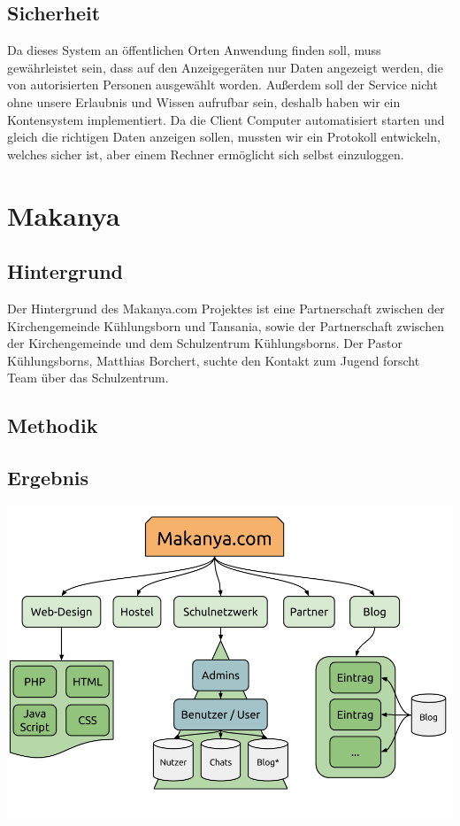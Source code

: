 \documentclass[a4paper,oneside,12pt,titlepage]{article}
\newcommand{\jf}{Jugend forscht }
\begin{document}
\subsection{Sicherheit} %
Da dieses System an öffentlichen Orten Anwendung finden soll, muss gewährleistet sein, dass auf den Anzeigegeräten nur Daten angezeigt werden, die von autorisierten Personen ausgewählt worden. Außerdem soll der Service nicht ohne unsere Erlaubnis und Wissen aufrufbar sein, deshalb haben wir ein Kontensystem implementiert. Da die Client Computer automatisiert starten und gleich die richtigen Daten anzeigen sollen, mussten wir ein Protokoll entwickeln, welches sicher ist, aber einem Rechner ermöglicht sich selbst einzuloggen.

\section{Makanya}

\subsection{Hintergrund} %
Der Hintergrund des Makanya.com Projektes ist eine Partnerschaft zwischen der Kirchengemeinde Kühlungsborn und Tansania, sowie der Partnerschaft zwischen der Kirchengemeinde und dem Schulzentrum Kühlungsborns. Der Pastor Kühlungsborns, Matthias Borchert, suchte den Kontakt zum \jf Team über das Schulzentrum.

\subsection{Methodik} %
\subsection{Ergebnis} %
\includegraphics[width=\linewidth]{imgs/makanyaOverview.png}\\
\end{document}
